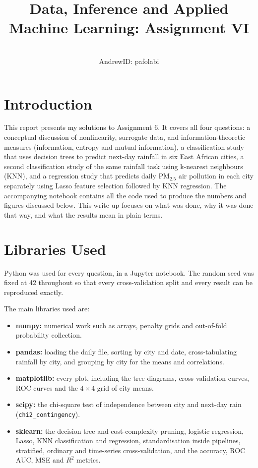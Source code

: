 \documentclass[conference]{IEEEtran}
\begin{document}
\title{Data, Inference and Applied Machine Learning: Assignment VI}

\author{ \\
AndrewID: pafolabi}

\maketitle

\section{Introduction}
This report presents my solutions to Assignment 6. It covers all four questions: a conceptual discussion of nonlinearity, surrogate data, and information-theoretic measures (information, entropy and mutual information), a classification study that uses decision trees to predict next-day rainfall in six East African cities, a second classification study of the same rainfall task using k-nearest neighbours (KNN), and a regression study that predicts daily PM$_{2.5}$ air pollution in each city separately using Lasso feature selection followed by KNN regression. The accompanying notebook contains all the code used to produce the numbers and figures discussed below. This write up focuses on what was done, why it was done that way, and what the results mean in plain terms.

\section{Libraries Used}
Python was used for every question, in a Jupyter notebook. The random seed was fixed at 42 throughout so that every cross-validation split and every result can be reproduced exactly.

The main libraries used are:
\begin{itemize}
    \item \textbf{numpy:} numerical work such as arrays, penalty grids and out-of-fold probability collection.
    \item \textbf{pandas:} loading the daily file, sorting by city and date, cross-tabulating rainfall by city, and grouping by city for the means and correlations.
    \item \textbf{matplotlib:} every plot, including the tree diagrams, cross-validation curves, ROC curves and the $4 \times 4$ grid of city means.
    \item \textbf{scipy:} the chi-square test of independence between city and next-day rain (\texttt{chi2\_contingency}).
    \item \textbf{sklearn:} the decision tree and cost-complexity pruning, logistic regression, Lasso, KNN classification and regression, standardisation inside pipelines, stratified, ordinary and time-series cross-validation, and the accuracy, ROC AUC, MSE and $R^2$ metrics.
\end{itemize}
\end{document}
